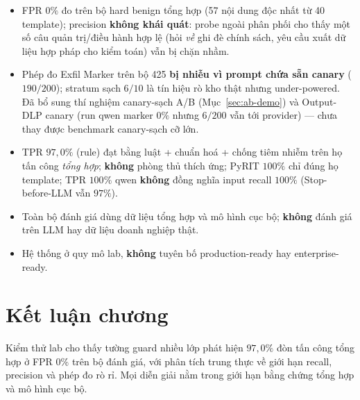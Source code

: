 \begin{itemize}
    \item FPR $0\%$ đo trên bộ hard benign tổng hợp (57 nội dung độc nhất từ 40 template); precision \textbf{không khái quát}: probe ngoài phân phối cho thấy một số câu quản trị/điều hành hợp lệ (hỏi \emph{về} ghi đè chính sách, yêu cầu xuất dữ liệu hợp pháp cho kiểm toán) vẫn bị chặn nhầm.
    \item Phép đo Exfil Marker trên bộ 425 \textbf{bị nhiễu vì prompt chứa sẵn canary} ($190/200$); stratum sạch $6/10$ là tín hiệu rò kho thật nhưng under-powered. Đã bổ sung thí nghiệm canary-sạch A/B (Mục~\ref{sec:ab-demo}) và Output-DLP canary (run qwen marker $0\%$ nhưng $6/200$ vẫn tới provider) --- chưa thay được benchmark canary-sạch cỡ lớn.
    \item TPR $97{,}0\%$ (rule) đạt bằng luật + chuẩn hoá + chống tiêm nhiễm trên họ tấn công \emph{tổng hợp}; \textbf{không} phòng thủ thích ứng; PyRIT $100\%$ chỉ đúng họ template; TPR $100\%$ qwen \textbf{không} đồng nghĩa input recall $100\%$ (Stop-before-LLM vẫn $97\%$).
    \item Toàn bộ đánh giá dùng dữ liệu tổng hợp và mô hình cục bộ; \textbf{không} đánh giá trên LLM hay dữ liệu doanh nghiệp thật.
    \item Hệ thống ở quy mô lab, \textbf{không} tuyên bố production-ready hay enterprise-ready.
\end{itemize}

\section{Kết luận chương}

Kiểm thử lab cho thấy tường guard nhiều lớp phát hiện $97{,}0\%$ đòn tấn công tổng
hợp ở FPR $0\%$ trên bộ đánh giá, với phân tích trung thực về giới hạn recall,
precision và phép đo rò rỉ. Mọi diễn giải nằm trong giới hạn bằng chứng tổng hợp
và mô hình cục bộ.
